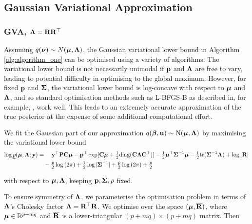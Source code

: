 \documentclass[times, doublespace]{anzsauth}
\begin{document}
	\subsection{Gaussian Variational Approximation}
	
	
	\subsubsection{GVA, ${\boldsymbol \Lambda}={\bf R} {\bf R}^\top$}
	
	Assuming $q({\boldsymbol \nu}) \sim N({\boldsymbol \mu}, {\boldsymbol \Lambda})$, the Gaussian variational lower bound in Algorithm
	\ref{alg:algorithm_one} can be optimised using a variety of algorithms. The variational lower bound is not
	necessarily unimodal if ${\bf p}$ and ${\boldsymbol \Lambda}$ are free to vary, leading to potential difficulty in optimising
	to the global maximum. However, for fixed ${\bf p}$ and ${\boldsymbol \Sigma}$, the variational lower bound is log-concave
	with respect to ${\boldsymbol \mu}$ and ${\boldsymbol \Lambda}$, and so standard optimisation methods such as L-BFGS-B as described
	in, for example, \cite{Liu1989}, work well. This leads to an extremely accurate approximation of the true
	posterior at the expense of some additional computational effort.
	
	\noindent We fit the Gaussian part of our approximation $q({\boldsymbol \beta}, {\bf u}) \sim \text{N}({\boldsymbol \mu}, {\boldsymbol \Lambda})$ by maximising 
	the variational lower bound	
	\begin{align*}
		\log \underline{p}({\boldsymbol \mu}, {\boldsymbol \Lambda}; {\bf y}) & = \quad {\bf y}^\top{\bf P} {\bf C} {\boldsymbol\mu} - {\bf p}^\top \exp[{\bf C} {\boldsymbol \mu} + \tfrac{1}{2} \text{diag}({\bf C} {\boldsymbol \Lambda} {\bf C}^\top)] - \tfrac{1}{2} {\boldsymbol \mu}^\top {\boldsymbol\Sigma}^{-1} {\boldsymbol \mu} - \tfrac{1}{2} \text{tr}{({\boldsymbol\Sigma}^{-1} {\boldsymbol\Lambda})} + \log{|{\bf R}|} \\
		                                        & \quad - \tfrac{p}{2} \log{(2 \pi)} + \tfrac{1}{2} \log{|{\boldsymbol\Sigma}^{-1}|} + \tfrac{p}{2} \log{(2 \pi)} + \tfrac{p}{2}                                                                              \\
	\end{align*}

	\noindent with respect to ${\boldsymbol \mu}, {\boldsymbol \Lambda}$, keeping ${\bf p}, {\boldsymbol \Sigma}, \rho$ fixed.
	
	\noindent To ensure symmetry of ${\boldsymbol \Lambda}$, we parameterise the optimisation problem in terms of ${\boldsymbol \Lambda}$'s
	Cholesky factor  ${\boldsymbol \Lambda} = {\bf R}^\top {\bf R}$. We optimise over the space $({\boldsymbol \mu}, \overline{{\bf R}})$, where ${\boldsymbol \mu}
	\in {\mathbb{R}}^{p + mq}$ and $\overline{{\bf R}}$ is a lower-triangular $(p + mq) \times (p + mq)$ matrix. Then
	
\end{document}

